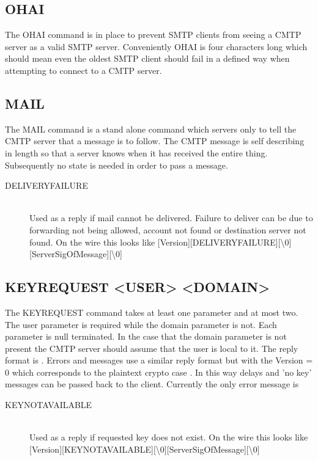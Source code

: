 \documentclass[a4paper,11pt]{article}
\begin{document}
\subsection{OHAI}
The OHAI command is in place to prevent SMTP clients from seeing a CMTP server as a valid SMTP server. Conveniently OHAI is four characters long which should mean even the oldest SMTP client should fail in a defined way when attempting to connect to a CMTP server.
\subsection{MAIL}
The MAIL command is a stand alone command which servers only to tell the CMTP server that a message is to follow. The CMTP message is self describing in length so that a server knows when it has received the entire thing. Subsequently no state is needed in order to pass a message.
\begin{description}
  \item [DELIVERYFAILURE] \hfill \\
   Used as a reply if mail cannot be delivered. Failure to deliver can be due to forwarding not being allowed, account not found or destination server not found. On the wire this looks like [Version][DELIVERYFAILURE][\textbackslash 0][ServerSigOfMessage][\textbackslash 0]
\end{description}
\subsection{KEYREQUEST <USER> <DOMAIN>}
The KEYREQUEST command takes at least one parameter and at most two. The user parameter is required while the domain parameter is not. Each parameter is null terminated. In the case that the domain parameter is not present the CMTP server should assume that the user is local to it. The reply format is \newline
[Version][UserPublicKey][\textbackslash 0][ServerSigOfKey][\textbackslash 0]. \newline
Errors and messages use a similar reply format but with the Version = 0 which corresponds to the plaintext crypto case \newline
[Version][Message][\textbackslash 0][ServerSigOfMessage][\textbackslash 0]. \newline
In this way delays and 'no key' messages can be passed back to the client. Currently the only error message is
\begin{description}
  \item [KEYNOTAVAILABLE] \hfill \\
   Used as a reply if requested key does not exist. On the wire this looks like [Version][KEYNOTAVAILABLE][\textbackslash 0][ServerSigOfMessage][\textbackslash 0]
\end{description}
\end{document}

